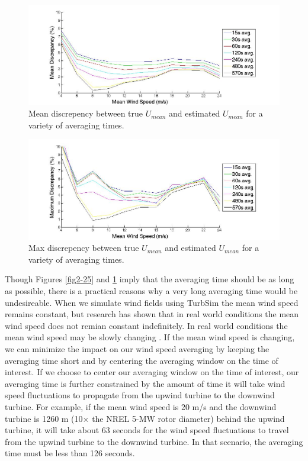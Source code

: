 \begin{figure}[htbp]
	\centering
		\includegraphics[width = \linewidth]{Figures/ch2Figures/fig2-26.jpg}
		
	\caption{Mean discrepency between true $U_{mean}$ and estimated $U_{mean}$ for a variety of averaging times.}
	\label{fig2-26}
\end{figure}

\begin{figure}[htbp]
	\centering
		\includegraphics[width = \linewidth]{Figures/ch2Figures/fig2-27.jpg}
		
	\caption{Max discrepency between true $U_{mean}$ and estimated $U_{mean}$ for a variety of averaging times.}
	\label{fig2-27}
\end{figure}

Though Figures  \ref{fig2-25} and \ref{fig2-26} imply that the averaging time should be as long as possible, there is a practical reasons why a very long averaging time would be undesireable. When we simulate wind fields using TurbSim the mean wind speed remains constant, but research has shown that in real world conditions the mean wind speed does not remian constant indefinitely. In real world conditions the mean wind speed may be slowly changing \cite{vanderhoven1957}. If the mean wind speed is changing, we can minimize the impact on our wind speed averaging by keeping the averaging time short and by centering the averaging window on the time of interest. If we choose to center our averaging window on the time of interest, our averaging time is further constrained by the amount of time it will take wind speed fluctuations to propagate from the upwind turbine to the downwind turbine. For example, if the mean wind speed is 20 m/s and the downwind turbine is 1260 m (10$\times$ the NREL 5-MW rotor diameter) behind the upwind turbine, it will take about 63 seconds for the wind speed fluctuations to travel from the upwind turbine to the downwind turbine. In that scenario, the averaging time must be less than 126 seconds.

